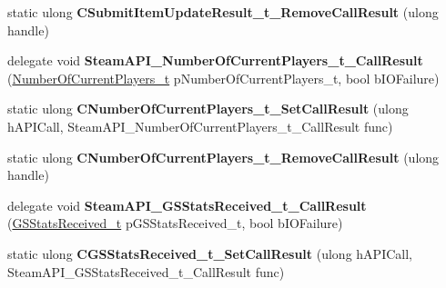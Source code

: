 \begin{DoxyCompactItemize}
\item 
\mbox{\label{class_valve_1_1_interop_1_1_native_entrypoints_a18141f4c73510df36c4cfdcff78302e9}} 
static ulong {\bfseries C\+Submit\+Item\+Update\+Result\+\_\+t\+\_\+\+Remove\+Call\+Result} (ulong handle)
\item 
\mbox{\label{class_valve_1_1_interop_1_1_native_entrypoints_a817d00a7c744d7274c13fb59887e8257}} 
delegate void {\bfseries Steam\+A\+P\+I\+\_\+\+Number\+Of\+Current\+Players\+\_\+t\+\_\+\+Call\+Result} (\hyperlink{struct_valve_1_1_steamworks_1_1_number_of_current_players__t}{Number\+Of\+Current\+Players\+\_\+t} p\+Number\+Of\+Current\+Players\+\_\+t, bool b\+I\+O\+Failure)
\item 
\mbox{\label{class_valve_1_1_interop_1_1_native_entrypoints_aedd04b27109d34b5ed8c1f5e6161b2e9}} 
static ulong {\bfseries C\+Number\+Of\+Current\+Players\+\_\+t\+\_\+\+Set\+Call\+Result} (ulong h\+A\+P\+I\+Call, Steam\+A\+P\+I\+\_\+\+Number\+Of\+Current\+Players\+\_\+t\+\_\+\+Call\+Result func)
\item 
\mbox{\label{class_valve_1_1_interop_1_1_native_entrypoints_af4e233362c0583d04bd153cac814612b}} 
static ulong {\bfseries C\+Number\+Of\+Current\+Players\+\_\+t\+\_\+\+Remove\+Call\+Result} (ulong handle)
\item 
\mbox{\label{class_valve_1_1_interop_1_1_native_entrypoints_a8936eec924b009d0f98af65317f55ad8}} 
delegate void {\bfseries Steam\+A\+P\+I\+\_\+\+G\+S\+Stats\+Received\+\_\+t\+\_\+\+Call\+Result} (\hyperlink{struct_valve_1_1_steamworks_1_1_g_s_stats_received__t}{G\+S\+Stats\+Received\+\_\+t} p\+G\+S\+Stats\+Received\+\_\+t, bool b\+I\+O\+Failure)
\item 
\mbox{\label{class_valve_1_1_interop_1_1_native_entrypoints_ab0c2d36e2d7340c403087b30e617bcf6}} 
static ulong {\bfseries C\+G\+S\+Stats\+Received\+\_\+t\+\_\+\+Set\+Call\+Result} (ulong h\+A\+P\+I\+Call, Steam\+A\+P\+I\+\_\+\+G\+S\+Stats\+Received\+\_\+t\+\_\+\+Call\+Result func)
\item 
\mbox{\label{class_valve_1_1_interop_1_1_native_entrypoints_a19a00f7b71b856557985ea0cb195c082}} 

\end{DoxyCompactItemize}
